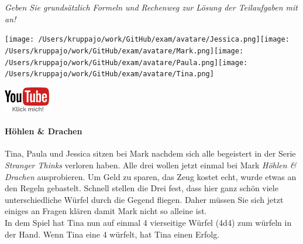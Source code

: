 \documentclass[a4paper, 9pt]{scrartcl}\usepackage[]{graphicx}\usepackage[]{xcolor}
\begin{document}
\textit{Geben Sie grundsätzlich Formeln und Rechenweg zur Lösung der Teilaufgaben mit an!} \\[1Ex]
 

 
\ifcollection
\begin{flushright}
\tiny\vspace{-3Ex}
\textbf{\examinhaltstart}
\exammodulemathstat
\vspace{-4Ex}
\end{flushright}
\begin{minipage}[t]{0.5\textwidth}
\texttt{[image: /Users/kruppajo/work/GitHub/exam/avatare/Jessica.png]}\hspace{-4mm}\texttt{[image: /Users/kruppajo/work/GitHub/exam/avatare/Mark.png]}\hspace{-4mm}\texttt{[image: /Users/kruppajo/work/GitHub/exam/avatare/Paula.png]}\hspace{-4mm}\texttt{[image: /Users/kruppajo/work/GitHub/exam/avatare/Tina.png]}
\end{minipage}
\begin{minipage}[t]{0.5\textwidth}
\hfill
\href{https://youtu.be/8Pb2sKUIMyk}{\includegraphics[width = 2cm]{img/youtube}}
\end{minipage}
\fi




\ifcollection
\paragraph{Höhlen \& Drachen}
\fi



Tina, Paula und Jessica sitzen bei Mark nachdem sich alle begeistert in der Serie \textit{Stranger Thinks} verloren haben. Alle drei wollen jetzt einmal bei Mark \textit{Höhlen \& Drachen} ausprobieren. Um Geld zu sparen, das Zeug kostet echt, wurde etwas an den Regeln gebastelt. Schnell stellen die Drei fest, dass hier ganz schön viele unterschiedliche Würfel durch die Gegend fliegen. Daher müssen Sie sich jetzt einiges an Fragen klären damit Mark nicht so alleine ist. \\%

In dem Spiel hat Tina nun auf einmal 4 vierseitige Würfel (4d4) zum würfeln in der Hand. Wenn Tina eine 4 würfelt, hat Tina einen Erfolg.
\end{document}
